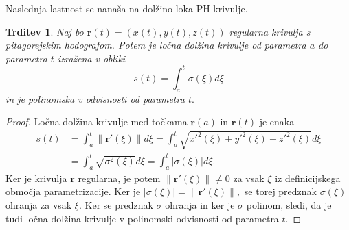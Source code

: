 \documentclass[12pt,a4paper,twoside]{article}
\theoremstyle{definition} %
\theoremstyle{plain} %
\newtheorem{trditev}[definicija]{Trditev}
\theoremstyle{primerstyle}
\numberwithin{equation}{section}  %
\newcommand{\rV}{\mathbf{r}}
\begin{document}
Naslednja lastnost se nanaša na dolžino loka PH-krivulje.
\begin{trditev}
	Naj bo $\rV(t)=(x(t),y(t),z(t))$ regularna krivulja s pitagorejskim hodografom. Potem je ločna dolžina krivulje od parametra $a$ do parametra $t$ izražena v obliki
	\begin{equation}
		s(t)=\int_a^t\sigma(\xi)d\xi
	\end{equation}
	in je polinomska v odvisnosti od parametra $t.$
\end{trditev}
\begin{proof}
	Ločna dolžina krivulje med točkama $\rV(a)$ in $\rV(t)$ je enaka
	\begin{align}
		s(t)&=\int_a^t\lVert \rV'(\xi) \rVert d\xi=\int_a^t\sqrt{x'^2(\xi)+y'^2(\xi)+z'^2(\xi)}d\xi\nonumber\\
		&=\int_a^t\sqrt{\sigma^2(\xi)}d\xi=\int_a^t|\sigma(\xi)|d\xi.
	\end{align}
	Ker je krivulja $\rV$ regularna, je potem $\lVert \rV'(\xi) \rVert \neq 0$ za vsak $\xi$ iz definicijskega območja parametrizacije. Ker je $|\sigma(\xi)|=\lVert \rV'(\xi) \rVert,$ se torej predznak $\sigma(\xi)$ ohranja za vsak $\xi.$ Ker se predznak $\sigma$ ohranja in ker je $\sigma$ polinom, sledi, da je tudi ločna dolžina krivulje v polinomski odvisnosti od parametra $t.$
\end{proof}
\end{document}
